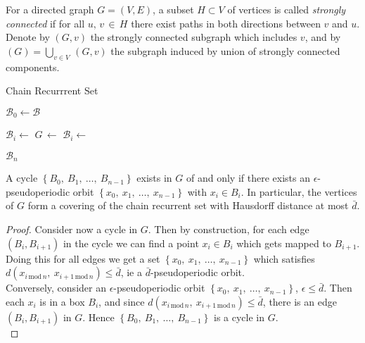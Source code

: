 \begin{definition}
    For a directed graph $G = (V, E)$, a subset $H \subset V$ of vertices is called 
    \emph{strongly connected} if for all $u,\, v\, \in\, H$ there exist paths in both 
    directions between $v$ and $u$. Denote by $(G, v)$ the strongly connected
    subgraph which includes $v$, and by 
    $(G) = \bigcup_{v \in V}\,$$(G, v)$ 
    the subgraph induced by union of strongly connected components.
\end{definition}

\begin{algorithm}
    \caption{Chain Recurrrent Set}
    \label{alg:chain}

    \begin{algorithmic}[1]
        \State $\mathcal{B}_0 \gets \mathcal{B}$

            \State $\mathcal{B}_i \gets$ 
            \State $G\, \gets$ 
            \State $\mathcal{B}_i \gets$ 
        \EndFor

        \State \Return $\mathcal{B}_n$
    \end{algorithmic}
\end{algorithm}

\begin{proposition}
    A cycle $\left\{ B_0,\ B_1,\ \ldots,\ B_{n-1} \right\}$ exists in $G$
    of and only if there exists an $\epsilon$-pseudoperiodic orbit 
    $\left\{ x_0,\ x_1,\ \ldots,\ x_{n-1} \right\}$ with $x_i \in B_i$.
    In particular, the vertices of $G$ form a covering of the chain recurrent set with 
    Hausdorff distance at most $\bar{d}$.
\end{proposition}

\begin{proof}
    Consider now a cycle in $G$. Then by construction, for each edge $(B_i, B_{i+1})$ in the 
    cycle we can find a point $x_i \in B_i$ which gets mapped to $B_{i+1}$. Doing this for all
    edges we get a set $\left\{ x_0,\ x_1,\ \ldots,\ x_{n-1} \right\}$ which satisfies 
    $d(x_{i\, \text{mod}\, n},\ x_{i+1\, \text{mod}\, n}) \leq \bar{d}$, ie a 
    $\bar{d}$-pseudoperiodic orbit. \\

    Conversely, consider an $\epsilon$-pseudoperiodic orbit 
    $\left\{ x_0,\ x_1,\ \ldots,\ x_{n-1} \right\}$, $\epsilon \leq \bar{d}$. Then each $x_i$ is in
    a box $B_i$, and since $d(x_{i\, \text{mod}\, n},\ x_{i+1\, \text{mod}\, n}) \leq \bar{d}$, 
    there is an edge $(B_i, B_{i+1})$ in $G$. Hence 
    $\left\{ B_0,\ B_1,\ \ldots,\ B_{n-1} \right\}$ is a cycle in $G$. \\
\end{proof}

